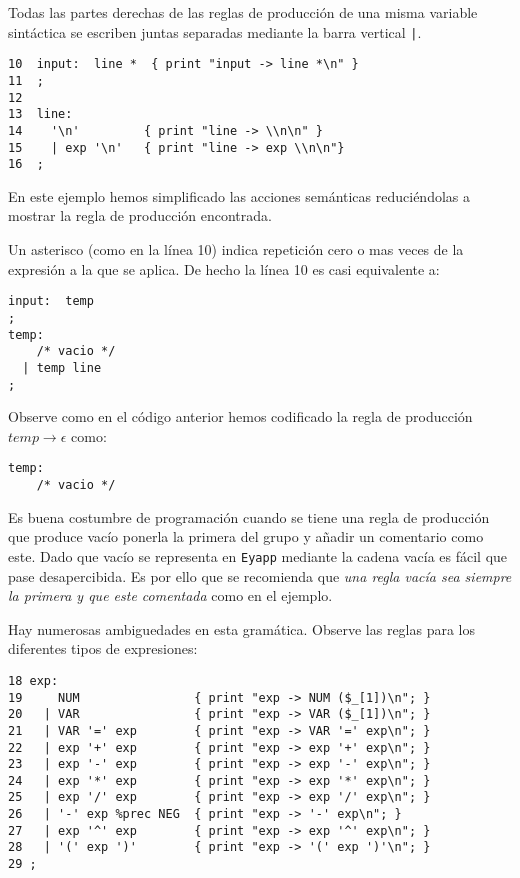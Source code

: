 
Todas las partes derechas de las reglas de producción de una misma variable sintáctica se escriben
juntas separadas mediante la barra vertical \verb#|#.

\begin{verbatim}
10  input:  line *  { print "input -> line *\n" }
11  ;
12
13  line:
14    '\n'         { print "line -> \\n\n" }
15    | exp '\n'   { print "line -> exp \\n\n"}
16  ;
\end{verbatim}

En este ejemplo hemos simplificado las acciones semánticas 
reduciéndolas a mostrar la regla de producción encontrada.

\label{parrafo:reglasvacias}

Un asterisco (como en la línea 10) indica repetición cero o mas veces
de la expresión a la que se aplica.
De hecho la línea 10 es casi equivalente a:

\begin{verbatim}
input:  temp   
;
temp: 
    /* vacio */
  | temp line
;
\end{verbatim}

Observe como en el código anterior
hemos codificado la regla de producción $temp \rightarrow \epsilon$
como:

\begin{verbatim}
temp: 
    /* vacio */
\end{verbatim}

Es buena costumbre de programación
cuando se tiene una regla de producción que produce vacío 
ponerla la primera del grupo y añadir un comentario como este.
Dado que vacío se representa en \verb|Eyapp| mediante la cadena vacía
es fácil que pase desapercibida. Es por ello que se recomienda
que \emph{una regla vacía sea siempre la primera y que este comentada}
como en el ejemplo.



Hay numerosas ambiguedades en esta gramática. 
Observe las reglas para los diferentes tipos de expresiones:

\begin{verbatim}
18 exp:
19     NUM                { print "exp -> NUM ($_[1])\n"; }
20   | VAR                { print "exp -> VAR ($_[1])\n"; }
21   | VAR '=' exp        { print "exp -> VAR '=' exp\n"; }
22   | exp '+' exp        { print "exp -> exp '+' exp\n"; }
23   | exp '-' exp        { print "exp -> exp '-' exp\n"; }
24   | exp '*' exp        { print "exp -> exp '*' exp\n"; }
25   | exp '/' exp        { print "exp -> exp '/' exp\n"; }
26   | '-' exp %prec NEG  { print "exp -> '-' exp\n"; }
27   | exp '^' exp        { print "exp -> exp '^' exp\n"; }
28   | '(' exp ')'        { print "exp -> '(' exp ')'\n"; }
29 ;
\end{verbatim}

